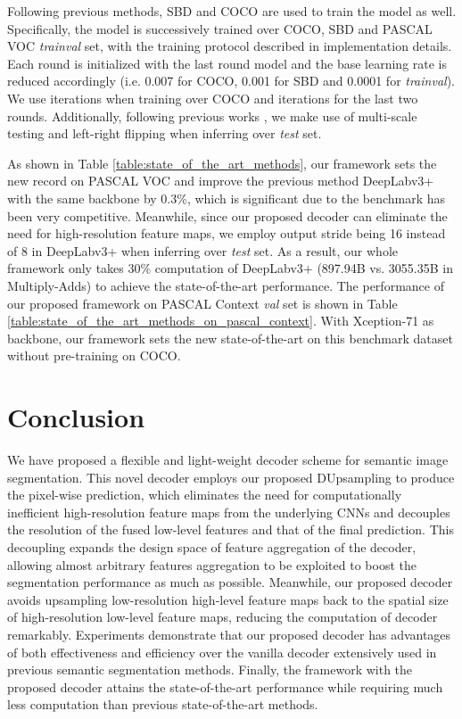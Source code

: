 \documentclass[10pt,twocolumn,letterpaper]{article}
\newcommand{\1}{{\mathbbm{1}}}
\begin{document}
Following previous methods, SBD \cite{hariharan2011semantic} and COCO \cite{lin2014microsoft} are used to train the model as well. Specifically, the model is successively trained over COCO, SBD and PASCAL VOC {\it trainval} set, with the training protocol described in implementation details. Each round is initialized with the last round model and the base learning rate is reduced accordingly (i.e. 0.007 for COCO, 0.001 for SBD and 0.0001 for {\it trainval}). We use  iterations when training over COCO and  iterations for the last two rounds. Additionally, following previous works \cite{chen2017rethinking, chen2018encoder}, we make use of multi-scale testing and left-right flipping when inferring over {\it test} set.

As shown in Table \ref{table:state_of_the_art_methods}, our framework sets the new record on PASCAL VOC and improve the previous method DeepLabv3+ with the same backbone by 0.3\%, which is significant due to the benchmark has been very competitive. Meanwhile, since our proposed decoder can eliminate the need for high-resolution feature maps, we employ output stride being 16 instead of 8 in DeepLabv3+ when inferring over {\it test} set. As a result, our whole framework only takes 30\% computation of DeepLabv3+ (897.94B vs. 3055.35B in Multiply-Adds) to achieve the state-of-the-art performance. The performance of our proposed framework on PASCAL Context {\it val} set is shown in Table \ref{table:state_of_the_art_methods_on_pascal_context}. With Xception-71 as backbone, our framework sets the new state-of-the-art on this benchmark dataset without pre-training on COCO.

\section{Conclusion}
We have proposed a flexible and light-weight decoder scheme for semantic image segmentation. This novel decoder employs our proposed DUpsampling to produce the pixel-wise prediction, which eliminates the need for computationally inefficient high-resolution feature maps from the underlying CNNs and decouples the resolution of the fused low-level features and that of the final prediction. This decoupling expands the design space of feature aggregation of the decoder, allowing almost arbitrary features aggregation to be exploited to boost the segmentation performance as much as possible. Meanwhile, our proposed decoder avoids upsampling low-resolution high-level feature maps back to the spatial size of high-resolution low-level feature maps, reducing the computation of decoder remarkably. Experiments demonstrate that our proposed decoder has advantages of both effectiveness and efficiency over the vanilla decoder extensively used in previous semantic segmentation methods. Finally, the framework with the proposed decoder attains the state-of-the-art performance while requiring much less computation than previous state-of-the-art methods.
\end{document}
